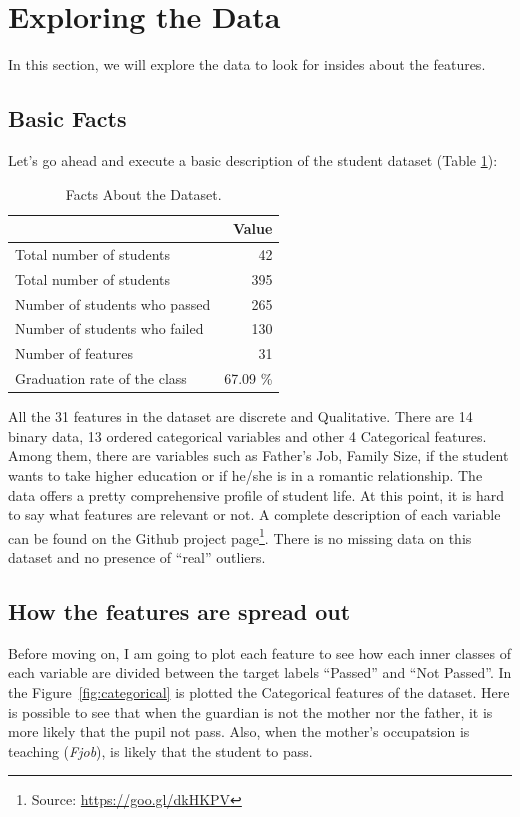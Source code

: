 \documentclass[a4paper]{article}
\begin{document}
\section{Exploring the Data}
\label{sec:exploring_data}
In this section, we will explore the data to look for insides about the features.

\subsection{Basic Facts}
Let's go ahead and execute a basic description of the student dataset (Table \ref{tab:basicfacts}):

\begin{table}[ht]
\centering
\begin{tabular}{l|r}
 & Value \\\hline
Total number of students & 42 \\
Total number of students & 395 \\
Number of students who passed & 265 \\
Number of students who failed & 130 \\
Number of features & 31 \\
Graduation rate of the class & 67.09 \%

\end{tabular}
\caption{\label{tab:basicfacts}Facts About the Dataset.}
\end{table}

All the 31 features in the dataset are discrete and Qualitative. There are 14 binary data, 13 ordered categorical variables and other 4 Categorical features. Among them, there are variables such as Father's Job, Family Size, if the student wants to take higher education or if he/she is in a romantic relationship. The data offers a pretty comprehensive profile of student life. At this point, it is hard to say what features are relevant or not. A complete description of each variable can be found on the Github project page\footnote{Source: \url{https://goo.gl/dkHKPV}}. There is no missing data on this dataset and no presence of ``real'' outliers.

\subsection{How the features are spread out}
Before moving on, I am going to plot each feature to see how each inner classes of each variable are divided between the target labels ``Passed'' and ``Not Passed''. In the Figure~\ref{fig:categorical} is plotted the Categorical features of the dataset. Here is possible to see that when the guardian is not the mother nor the father, it is more likely that the pupil not pass. Also, when the mother's occupatsion is teaching (\textit{Fjob}), is likely that the student to pass.
\end{document}
